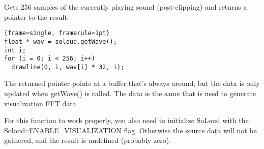 Gets 256 samples of the currently playing sound (post-clipping) and returns a pointer to the result.

\begin{lstlisting}{frame=single, framerule=1pt}
float * wav = soloud.getWave();
int i;
for (i = 0; i < 256; i++)
  drawline(0, i, wav[i] * 32, i);
\end{lstlisting}

The returned pointer points at a buffer that's always around, but the data is only updated when getWave() is called. The data is the same that is used to generate visualization FFT data.

For this function to work properly, you also need to initialize SoLoud with the \linebreak Soloud::ENABLE\_VISUALIZATION flag. Otherwise the source data will not be gathered, and the result is undefined (probably zero).
